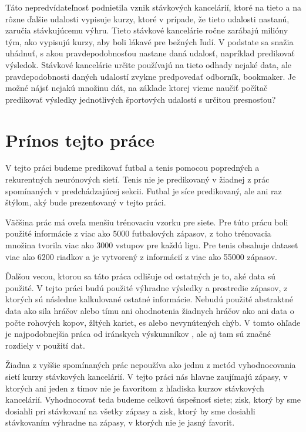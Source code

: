 Táto nepredvídateľnosť podnietila vznik stávkových kancelárií, ktoré na tieto a na rôzne ďalšie udalosti vypisuje kurzy, ktoré v prípade, že tieto udalosti nastanú, zaručia stávkujúcemu výhru.
Tieto stávkové kancelárie ročne zarábajú milióny tým, ako vypisujú kurzy, aby boli lákavé pre bežných ľudí.
V podstate sa snažia uhádnuť, s akou pravdepodobnosťou nastane daná udalosť, napríklad predikovať výsledok.
Stávkové kancelárie určite používajú na tieto odhady nejaké data, ale pravdepodobnosti daných udalostí zvykne predpovedať odborník, bookmaker.
Je možné nájsť nejakú množinu dát, na základe ktorej vieme naučiť počítač predikovať výsledky jednotlivých športových udalostí s určitou presnosťou?


\section*{Prínos tejto práce}
V tejto práci budeme predikovať futbal a tenis pomocou popredných a rekurentných neurónových sietí.
Tenis nie je predikovaný v žiadnej z prác spomínaných v predchádzajúcej sekcii.
Futbal je síce predikovaný, ale ani raz štýlom, aký bude prezentovaný v tejto práci.

Väčšina prác má oveľa menšiu trénovaciu vzorku pre siete. 
Pre túto prácu boli použité informácie z viac ako 5000 futbalových zápasov, z toho trénovacia množina tvorila viac ako 3000 vstupov pre každú ligu.
Pre tenis obsahuje dataset viac ako 6200 riadkov a je vytvorený z informácií z viac ako 55000 zápasov.

Ďalšou vecou, ktorou sa táto práca odlišuje od ostatných je to, aké data sú použité. V tejto práci budú použité výhradne výsledky a prostredie zápasov, z ktorých sú následne kalkulované ostatné informácie.
Nebudú použité abstraktné data ako sila hráčov alebo tímu ani ohodnotenia žiadnych hráčov ako ani data o počte rohových kopov, žltých kariet, es alebo nevynútených chýb. 
V tomto ohľade je najpodobnejšia práca od iránskych výskumníkov \citep{related:iran}, ale aj tam sú značné rozdiely v použití dat.

Žiadna z vyššie spomínaných prác nepoužíva ako jednu z metód vyhodnocovania sietí kurzy stávkových kancelárií.
V tejto práci nás hlavne zaujímajú zápasy, v ktorých ani jeden z tímov nie je favoritom z hľadiska kurzov stávkových kancelárií.
Vyhodnocovať teda budeme celkovú úspešnosť siete; zisk, ktorý by sme dosiahli pri stávkovaní na všetky zápasy a zisk, ktorý by sme dosiahli stávkovaním výhradne na zápasy, v ktorých nie je jasný favorit.
